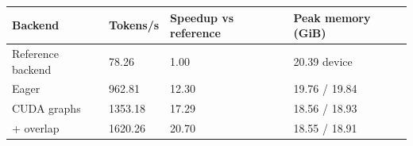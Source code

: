 \begin{tabular}{llll}
\toprule
Backend & Tokens/s & Speedup vs reference & Peak memory (GiB) \\
\midrule
Reference backend & 78.26 & 1.00 & 20.39 device \\
Eager & 962.81 & 12.30 & 19.76 / 19.84 \\
CUDA graphs & 1353.18 & 17.29 & 18.56 / 18.93 \\
+ overlap & 1620.26 & 20.70 & 18.55 / 18.91 \\
\bottomrule
\end{tabular}
